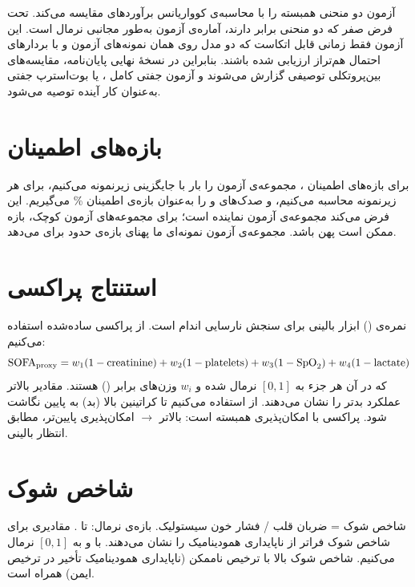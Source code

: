 آزمون  دو منحنی  همبسته را با محاسبه‌ی کوواریانس برآوردهای  مقایسه می‌کند. تحت فرض صفر که دو منحنی  برابر دارند، آماره‌ی آزمون به‌طور مجانبی نرمال است. این آزمون فقط زمانی قابل اتکاست که دو مدل روی همان نمونه‌های آزمون و با بردارهای احتمال هم‌تراز ارزیابی شده باشند. بنابراین در نسخۀ نهایی پایان‌نامه، مقایسه‌های بین‌پروتکلی توصیفی گزارش می‌شوند و آزمون جفتی کامل ،  یا بوت‌استرپ جفتی به‌عنوان کار آینده توصیه می‌شود.

\section{بازه‌های اطمینان }

برای بازه‌های اطمینان ، مجموعه‌ی آزمون را  بار با جایگزینی زیرنمونه می‌کنیم، برای هر زیرنمونه  محاسبه می‌کنیم، و صدک‌های  و  را به‌عنوان بازه‌ی اطمینان \% می‌گیریم. این فرض می‌کند مجموعه‌ی آزمون نماینده است؛ برای مجموعه‌های آزمون کوچک، بازه ممکن است پهن باشد. مجموعه‌ی آزمون  نمونه‌ای ما پهنای بازه‌ی حدود  برای  می‌دهد.

\section{استنتاج پراکسی }

نمره‌ی  () ابزار بالینی برای سنجش نارسایی اندام است. از پراکسی ساده‌شده استفاده می‌کنیم:
\begin{equation}
\text{SOFA}_{\text{proxy}} = w_1(1 - \text{creatinine}) + w_2(1 - \text{platelets}) + w_3(1 - \text{SpO}_2) + w_4(1 - \text{lactate})
\end{equation}
که در آن هر جزء به $[0,1]$ نرمال شده و $w_i$ وزن‌های برابر () هستند. مقادیر بالاتر عملکرد بدتر را نشان می‌دهند. از  استفاده می‌کنیم تا کراتینین بالا (بد) به  پایین نگاشت شود. پراکسی با امکان‌پذیری همبسته است:  بالاتر $\to$ امکان‌پذیری پایین‌تر، مطابق انتظار بالینی.

\section{شاخص شوک}

شاخص شوک = ضربان قلب / فشار خون سیستولیک. بازه‌ی نرمال:  تا . مقادیری برای شاخص شوک فراتر از  ناپایداری همودینامیک را نشان می‌دهند. با  و  به $[0,1]$ نرمال می‌کنیم. شاخص شوک بالا با ترخیص ناممکن (ناپایداری همودینامیک تأخیر در ترخیص ایمن) همراه است.
